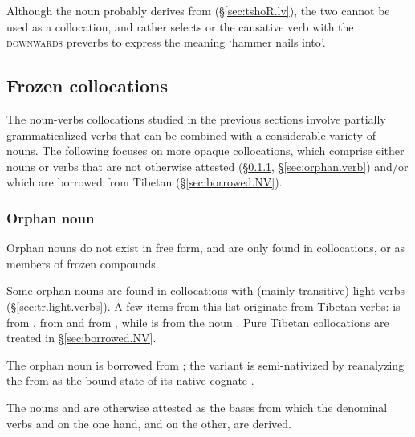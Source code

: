  Although the noun  probably derives from  (§\ref{sec:tshoR.lv}), the two cannot be used as a collocation, and  rather selects  or the causative verb  with the \textsc{downwards} preverbs to express the meaning `hammer nails into'.
 
\subsection{Frozen collocations} \label{sec:frozen.collocations}
The noun-verbs collocations studied in the previous sections involve partially grammaticalized verbs that can be combined with a considerable variety of nouns. The following focuses on more opaque collocations, which comprise either nouns or verbs that are not otherwise attested (§\ref{sec:orphan.noun}, §\ref{sec:orphan.verb}) and/or which are borrowed from Tibetan (§\ref{sec:borrowed.NV}).
 
\subsubsection{Orphan noun} \label{sec:orphan.noun}
Orphan nouns do not exist in free form, and are only found in collocations, or as members of frozen compounds.

Some orphan nouns are found in collocations with (mainly transitive) light verbs (§\ref{sec:tr.light.verbs}). A few items from this list originate from Tibetan verbs:  is from ,  from  and  from , while   is from the noun . Pure Tibetan collocations are treated in §\ref{sec:borrowed.NV}. 

The orphan noun  is borrowed from ; the variant   is semi-nativized by reanalyzing the  from  as the bound state  of its native cognate . 

The nouns  and  are otherwise attested as the bases from which the denominal verbs  and  on the one hand, and  on the other, are derived.  


